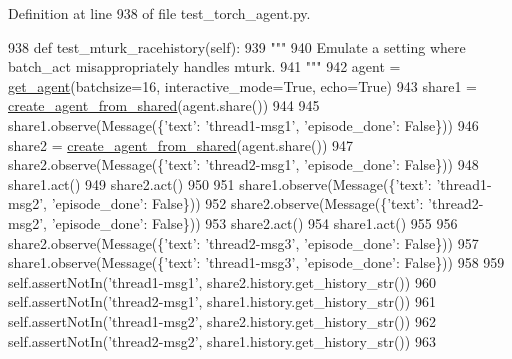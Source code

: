 Definition at line 938 of file test\+\_\+torch\+\_\+agent.\+py.


\begin{DoxyCode}
938     \textcolor{keyword}{def }test\_mturk\_racehistory(self):
939         \textcolor{stringliteral}{"""}
940 \textcolor{stringliteral}{        Emulate a setting where batch\_act misappropriately handles mturk.}
941 \textcolor{stringliteral}{        """}
942         agent = \hyperlink{namespacetests_1_1test__torch__agent_ae929d109305aaea29fbfa13ecf1f32e9}{get\_agent}(batchsize=16, interactive\_mode=\textcolor{keyword}{True}, echo=\textcolor{keyword}{True})
943         share1 = \hyperlink{namespaceparlai_1_1core_1_1agents_aa5af5dd1d2f9da491b60348d479b849f}{create\_agent\_from\_shared}(agent.share())
944 
945         share1.observe(Message(\{\textcolor{stringliteral}{'text'}: \textcolor{stringliteral}{'thread1-msg1'}, \textcolor{stringliteral}{'episode\_done'}: \textcolor{keyword}{False}\}))
946         share2 = \hyperlink{namespaceparlai_1_1core_1_1agents_aa5af5dd1d2f9da491b60348d479b849f}{create\_agent\_from\_shared}(agent.share())
947         share2.observe(Message(\{\textcolor{stringliteral}{'text'}: \textcolor{stringliteral}{'thread2-msg1'}, \textcolor{stringliteral}{'episode\_done'}: \textcolor{keyword}{False}\}))
948         share1.act()
949         share2.act()
950 
951         share1.observe(Message(\{\textcolor{stringliteral}{'text'}: \textcolor{stringliteral}{'thread1-msg2'}, \textcolor{stringliteral}{'episode\_done'}: \textcolor{keyword}{False}\}))
952         share2.observe(Message(\{\textcolor{stringliteral}{'text'}: \textcolor{stringliteral}{'thread2-msg2'}, \textcolor{stringliteral}{'episode\_done'}: \textcolor{keyword}{False}\}))
953         share2.act()
954         share1.act()
955 
956         share2.observe(Message(\{\textcolor{stringliteral}{'text'}: \textcolor{stringliteral}{'thread2-msg3'}, \textcolor{stringliteral}{'episode\_done'}: \textcolor{keyword}{False}\}))
957         share1.observe(Message(\{\textcolor{stringliteral}{'text'}: \textcolor{stringliteral}{'thread1-msg3'}, \textcolor{stringliteral}{'episode\_done'}: \textcolor{keyword}{False}\}))
958 
959         self.assertNotIn(\textcolor{stringliteral}{'thread1-msg1'}, share2.history.get\_history\_str())
960         self.assertNotIn(\textcolor{stringliteral}{'thread2-msg1'}, share1.history.get\_history\_str())
961         self.assertNotIn(\textcolor{stringliteral}{'thread1-msg2'}, share2.history.get\_history\_str())
962         self.assertNotIn(\textcolor{stringliteral}{'thread2-msg2'}, share1.history.get\_history\_str())
963 
\end{DoxyCode}
\mbox{\label{classtests_1_1test__torch__agent_1_1TestTorchAgent_ae3b6e4145176ba5d5e9179756d064332}} 
